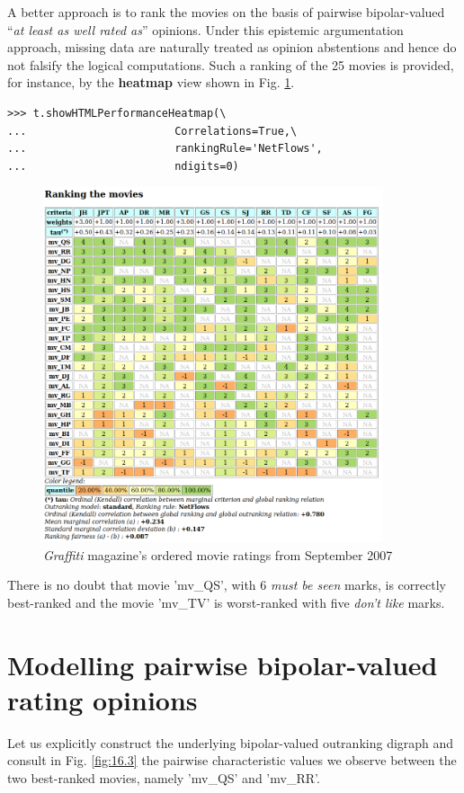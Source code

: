 A better approach is to rank the movies on the basis of pairwise bipolar-valued  ``\emph{at least as well rated as}'' opinions. Under this epistemic argumentation approach, missing data are naturally treated as opinion abstentions and hence do not falsify the logical computations. Such a ranking of the 25 movies is provided, for instance, by the \textbf{heatmap} view shown in Fig. \ref{fig:16.2}.

\begin{lstlisting}
>>> t.showHTMLPerformanceHeatmap(\
...                       Correlations=True,\
...                       rankingRule='NetFlows',
...                       ndigits=0)
\end{lstlisting}
\begin{figure}[h]
\includegraphics[width=10cm]{Figures/graffiti07_2.png}
\caption{\emph{Graffiti} magazine's ordered movie ratings from September 2007}
\label{fig:16.2}       %
\end{figure}

There is no doubt that movie 'mv\_QS', with 6 \emph{must be seen} marks, is correctly best-ranked and the movie 'mv\_TV' is worst-ranked with five \emph{don't like} marks.

\section{Modelling pairwise bipolar-valued rating opinions}
\label{sec:16.2}

Let us explicitly construct the underlying bipolar-valued outranking digraph and consult in Fig. \ref{fig:16.3} the pairwise characteristic values we observe between the two best-ranked movies, namely 'mv\_QS' and 'mv\_RR'.

